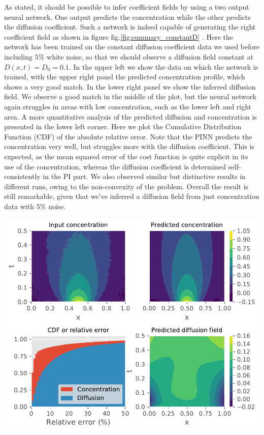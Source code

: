 \documentclass[12pt,a4paper,]{Dissertate}
\let\origfigure\figure
\let\endorigfigure\endfigure
\renewenvironment{figure}[1][2] {
    \expandafter\origfigure\expandafter[H]
} {
    \endorigfigure
}
\begin{document}
As stated, it should be possible to infer coefficient fields by using a
two output neural network. One output predicts the concentration while
the other predicts the diffusion coefficient. Such a network is indeed
capable of generating the right coefficient field as shown in figure
fig.\ref{fig:summary_constantD} . Here the network has been trained on
the constant diffusion coefficient data we used before including \(5\%\)
white noise, so that we should observe a diffusion field constant at
\(D(x,t) = D_0 = 0.1\). In the upper left we show the data on which the
network is trained, with the upper right panel the predicted
concentration profile, which shows a very good match. In the lower right
panel we show the inferred diffusion field. We observe a good match in
the middle of the plot, but the neural network again struggles in areas
with low concentration, such as the lower left and right area. A more
quantitative analysis of the predicted diffusion and concentration is
presented in the lower left corner. Here we plot the Cumulative
Distribution Function (CDF) of the absolute relative error. Note that
the PINN predicts the concentration very well, but struggles more with
the diffusion coefficient. This is expected, as the mean squared error
of the cost function is quite explicit in its use of the concentration,
whereas the diffusion coefficient is determined self-consistently in the
PI part. We also observed similar but distinctive results in different
runs, owing to the non-convexity of the problem. Overall the result is
still remarkable, given that we've inferred a diffusion field from just
concentration data with \(5\%\) noise.

\begin{figure}
\hypertarget{fig:summary_constantD}{%
\centering
\includegraphics{source/figures/pdf/summary_constantD_varyingPINN.pdf}
\caption{We show the training data and predicted concentration profile
in the upper left and right panels. The lower right panel shows the
inferred diffusion field while the lower left panel shows the CDF of the
relative error of the diffusion and
concentration.}\label{fig:summary_constantD}
}
\end{figure}
\end{document}
